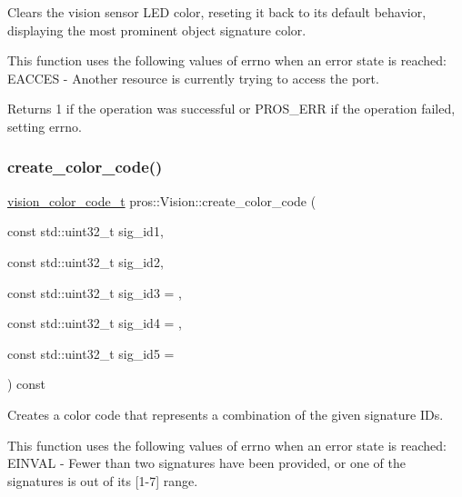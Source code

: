 Clears the vision sensor L\+ED color, reseting it back to its default behavior, displaying the most prominent object signature color. 

This function uses the following values of errno when an error state is reached\+: E\+A\+C\+C\+ES -\/ Another resource is currently trying to access the port.

\begin{DoxyReturn}{Returns}
1 if the operation was successful or P\+R\+O\+S\+\_\+\+E\+RR if the operation failed, setting errno. 
\end{DoxyReturn}
\mbox{\label{classpros_1_1Vision_ab50bcfb700b591e2f1654962baac400f}} 
\subsubsection{\texorpdfstring{create\_color\_code()}{create\_color\_code()}}
{\footnotesize\ttfamily \mbox{\hyperlink{vision_8h_a71f2011a47e95558bb534b05c16c7f2b}{vision\+\_\+color\+\_\+code\+\_\+t}} pros\+::\+Vision\+::create\+\_\+color\+\_\+code (\begin{DoxyParamCaption}\item[{const std\+::uint32\+\_\+t}]{sig\+\_\+id1,  }\item[{const std\+::uint32\+\_\+t}]{sig\+\_\+id2,  }\item[{const std\+::uint32\+\_\+t}]{sig\+\_\+id3 = {},  }\item[{const std\+::uint32\+\_\+t}]{sig\+\_\+id4 = {},  }\item[{const std\+::uint32\+\_\+t}]{sig\+\_\+id5 = {} }\end{DoxyParamCaption}) const}



Creates a color code that represents a combination of the given signature I\+Ds. 

This function uses the following values of errno when an error state is reached\+: E\+I\+N\+V\+AL -\/ Fewer than two signatures have been provided, or one of the signatures is out of its \mbox{[}1-\/7\mbox{]} range.


